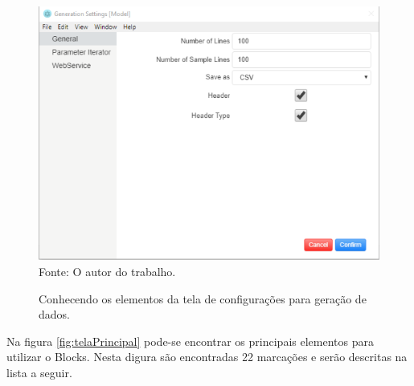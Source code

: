 \documentclass[
	12pt,				%
	openright,			%
	oneside,			%
	a4paper,			%
	english,			%
	brazil				%
	]{abntex2}
\begin{document}
		\begin{figure}[h]
			\centering
			\caption{Conhecendo os elementos da tela de configurações para geração de dados.}
			\includegraphics[width=\linewidth]{./figures/prototipo/generationSettings.png}
			\label{fig:generationSettings}
			\footnotesize Fonte: O autor do trabalho.
		\end{figure}
		\par
		Na figura \ref{fig:telaPrincipal} pode-se encontrar os principais elementos para utilizar o Blocks.
		Nesta digura são encontradas 22 marcações e serão descritas na lista a seguir.
\end{document}
